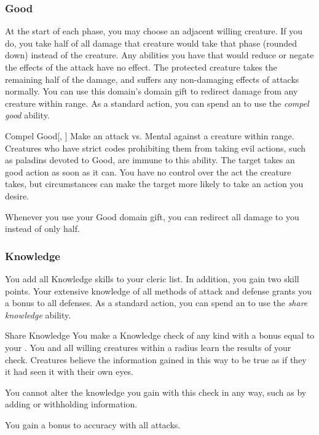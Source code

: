         \subsubsection{Good}
             At the start of each phase, you may choose an adjacent willing creature.
            If you do, you take half of all damage that creature would take that phase (rounded down) instead of the creature.
            Any abilities you have that would reduce or negate the effects of the attack have no effect.
            The protected creature takes the remaining half of the damage, and suffers any non-damaging effects of attacks normally.
             You can use this domain's domain gift to redirect damage from any creature within \rngclose range.
             As a standard action, you can spend an  to use the \textit{compel good} ability.
            \begin{ability}{Compel Good}[, ]
                Make an attack vs. Mental against a creature within \rngmed range.
                Creatures who have strict codes prohibiting them from taking evil actions, such as paladins devoted to Good, are immune to this ability.
                \hit The target takes an good action as soon as it can.
                You have no control over the act the creature takes, but circumstances can make the target more likely to take an action you desire.
            \end{ability}
             Whenever you use your Good domain gift, you can redirect all damage to you instead of only half.

        \subsubsection{Knowledge}
             You add all Knowledge skills to your cleric  list.
            In addition, you gain two skill points.
             Your extensive knowledge of all methods of attack and defense grants you a  bonus to all defenses.
             As a standard action, you can spend an  to use the \textit{share knowledge} ability.
            \begin{ability}{Share Knowledge}
                You make a Knowledge check of any kind with a bonus equal to your .
                You and all willing creatures within a \arealarge radius learn the results of your check.
                Creatures believe the information gained in this way to be true as if they it had seen it with their own eyes.

                You cannot alter the knowledge you gain with this check in any way, such as by adding or withholding information.
            \end{ability}
             You gain a  bonus to accuracy with all attacks.

